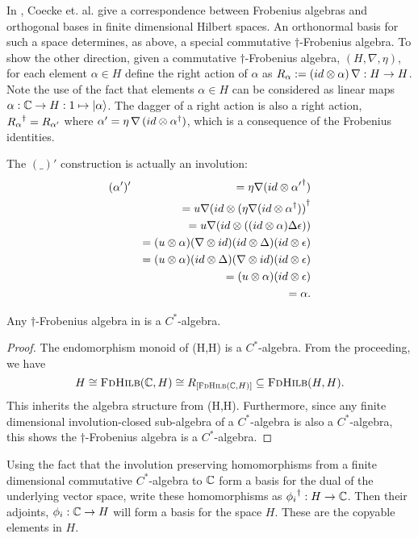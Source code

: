 In \cite{coeckeetal08:ortho}, Coecke et. al. give a correspondence between Frobenius algebras and
orthogonal bases in finite dimensional Hilbert spaces. An orthonormal basis for such a space
determines, as above, a special commutative $\dagger$-Frobenius algebra. To show the other
direction, given a commutative $\dagger$-Frobenius algebra, $(H,\nabla,\eta)$, for each element
$\alpha\in H$ define the right action of $\alpha$ as $R_{\alpha}:=(id\otimes\alpha)\, \nabla:H\to
H$. Note the use of the fact that elements $\alpha\in H$ can be considered as linear maps
$\alpha:\mathbb{C} \to H:1\mapsto \left\vert{\alpha}\right\rangle$. The dagger of a right action is also a right action,
${R_{\alpha}}^{\dagger} = R_{\alpha'}$ where $\alpha'= \eta\, \nabla\, (id\otimes {\alpha}^{\dagger})$, which is a
consequence of the Frobenius identities.

The $(\_)'$ construction is actually an involution:
\begin{eqnarray*}
  &(\alpha')' &= \eta \nabla (id \otimes {\alpha'}^{\dagger}) \\
  && = u \nabla (id \otimes {(\eta \nabla (id \otimes \ensuremath{{\alpha}^{\dagger}}))}^{\dagger}\\
  && = u \nabla (id \otimes ( (id \otimes \alpha) \Delta \epsilon))\\
  && = (u \otimes \alpha) (\nabla \otimes id) (id \otimes \Delta) (id \otimes  \epsilon)\\
  && = (u \otimes \alpha) (id \otimes \Delta) (\nabla \otimes id) (id \otimes  \epsilon)\\
  && = (u \otimes \alpha)  (id \otimes  \epsilon)\\
  && = \alpha.
\end{eqnarray*}

\begin{lemma}\label{lemma:cstaralgebra}
  Any $\dagger$-Frobenius algebra in \fdh is a $C^{*}$-algebra.
\end{lemma}
\begin{proof}
  The endomorphism monoid of \fdh(H,H) is a $C^{*}$-algebra. From the proceeding, we have
  \[
    H \cong \textsc{FdHilb}(\mathbb{C},H) \cong R_{[\textsc{FdHilb}(\mathbb{C},H)]}\subseteq\textsc{FdHilb}(H,H).
  \]
  This inherits the algebra structure from \fdh(H,H). Furthermore, since any finite dimensional
  involution-closed sub-algebra of a $C^{*}$-algebra is also a $C^{*}$-algebra, this shows the
  $\dagger$-Frobenius algebra is a $C^{*}$-algebra.
\end{proof}

Using the fact that the involution preserving homomorphisms from a finite dimensional commutative
$C^{*}$-algebra to $\mathbb{C}$ form a basis for the dual of the underlying vector space, write these
homomorphisms as ${\phi_{i}}^{\dagger}:H \to \mathbb{C}$. Then their adjoints, $\phi_{i}:\mathbb{C}\to H$ will form a
basis for the space $H$. These are the copyable elements in $H$.

